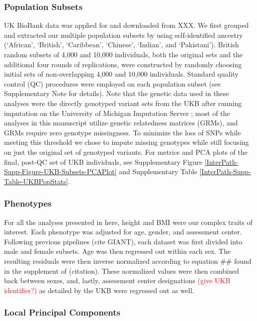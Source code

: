 \documentclass[12pt,a4paper]{article}
\begin{document}
\subsubsection{Population Subsets}
UK BioBank data was applied for and downloaded from XXX. We first grouped and extracted our multiple population subsets by using self-identified ancestry (`African', `British', `Caribbean', `Chinese', `Indian', and `Pakistani'). British random subsets of 4,000 and 10,000 individuals, both the original sets and the additional four rounds of replications, were constructed by randomly choosing initial sets of non-overlapping 4,000 and 10,000 individuals. Standard quality control (QC) procedures were employed on each population subset (see Supplementary Note for details). Note that the genetic data used in these analyses were the directly genotyped variant sets  from the UKB after running imputation on the University of Michigan Imputation Server \citep{Das2016}; most of the analyses in this manuscript utilize genetic relatedness matrices (GRMs), and GRMs require zero genotype missingness. To minimize the loss of SNPs while meeting this threshold we chose to impute missing genotypes while still focusing on just the original set of genotyped variants. For metrics and PCA plots of the final, post-QC set of UKB individuals, see Supplementary Figure \ref{InterPath-Supp-Figure-UKB-Subsets-PCAPlot} and Supplementary Table \ref{InterPath-Supp-Table-UKBPopStats}. 

\subsubsection{Phenotypes}

For all the analyses presented in here, height and BMI were our complex traits of interest. Each phenotype was adjusted for age, gender, and assessment center. Following previous pipelines (cite GIANT), each dataset was first divided into male and female subsets. Age was then regressed out within each sex. The resulting residuals were then inverse normalized according to equation \#\# found in the supplement of (citation). These normalized values were then combined back between sexes, and, lastly, assessment center designations \textcolor{red}{(give UKB identifier?)} as detailed by the UKB were regressed out as well. 

\subsubsection{Local Principal Components}
\end{document}
